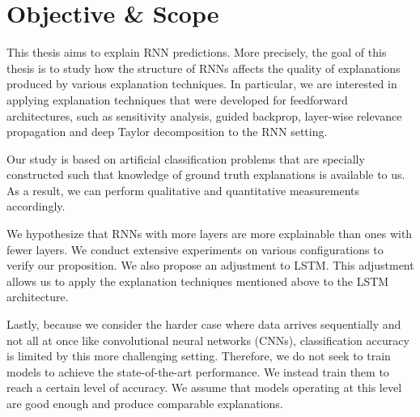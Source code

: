 \section{Objective \& Scope}
This thesis aims to explain RNN predictions. More precisely, the goal of this thesis is to study how the structure of RNNs affects the quality of explanations produced by various explanation techniques. In particular, we are interested in applying explanation techniques that were developed for feedforward architectures, such as sensitivity analysis, guided backprop, layer-wise relevance propagation and deep Taylor decomposition to the RNN setting. 

Our study is based on artificial classification problems that are specially constructed such that knowledge of ground truth explanations is available to us. As a result, we can perform qualitative and quantitative measurements accordingly.


We hypothesize that RNNs with more layers are more explainable than ones with fewer layers. We conduct extensive experiments on various configurations to verify our proposition. We also propose an adjustment to LSTM. This adjustment allows us to apply the explanation techniques mentioned above to the LSTM architecture.

Lastly, because we consider the harder case where data arrives sequentially and not all at once like convolutional neural networks (CNNs), classification accuracy is limited by this more challenging setting. Therefore, we do not seek to train models to achieve the state-of-the-art performance. We instead train them to reach a certain level of accuracy. We assume that models operating at this level are good enough and produce comparable explanations. 
%


%
%
%


